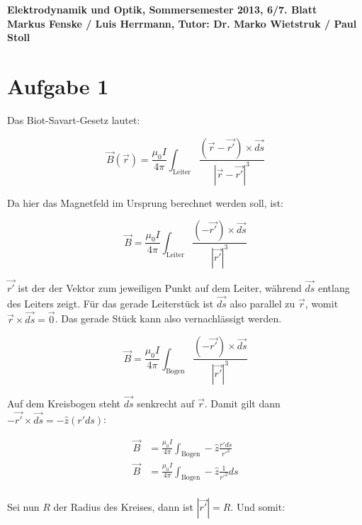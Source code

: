 \documentclass[a4paper,german,12pt,smallheadings]{scrartcl}
\begin{document}
\begin{center}
\bfseries %
\sffamily %
\vspace{-40pt}
Elektrodynamik und Optik, Sommersemester 2013, 6/7. Blatt \\
Markus Fenske / Luis Herrmann, Tutor: Dr. Marko Wietstruk / Paul Stoll
\vspace{-10pt}
\end{center}
\section*{Aufgabe 1}
Das Biot-Savart-Gesetz lautet:

\begin{equation}
  \vec{B}(\vec{r}) = \frac{\mu_0 I}{4 \pi} \int_{\text{Leiter}} \frac{(\vec{r} - \vec{r'}) \times \vec{ds}}{|\vec{r}-\vec{r'}|^3}
\end{equation}

Da hier das Magnetfeld im Ursprung berechnet werden soll, ist:


\begin{equation}
  \vec{B} = \frac{\mu_0 I}{4 \pi} \int_{\text{Leiter}} \frac{(-\vec{r'}) \times \vec{ds}}{|\vec{r'}|^3}
\end{equation}

$\vec{r'}$ ist der der Vektor zum jeweiligen Punkt auf dem Leiter, während
$\vec{ds}$ entlang des Leiters zeigt. Für das gerade Leiterstück ist $\vec{ds}$
also parallel zu $\vec{r}$, womit $\vec{r} \times \vec{ds} = \vec{0}$. Das
gerade Stück kann also vernachlässigt werden.

\begin{equation}
  \vec{B} = \frac{\mu_0 I}{4 \pi} \int_{\text{Bogen}} \frac{(-\vec{r'}) \times \vec{ds}}{|\vec{r'}|^3}
\end{equation}

Auf dem Kreisbogen steht $\vec{ds}$ senkrecht auf $\vec{r}$. Damit gilt dann
$-\vec{r'} \times \vec{ds} = -\widehat{z} (r' ds)$:

\begin{align}
  \vec{B} &= \frac{\mu_0 I}{4 \pi} \int_{\text{Bogen}} -\widehat{z} \frac{r' ds}{r'^3} \\
  \vec{B} &= \frac{\mu_0 I}{4 \pi} \int_{\text{Bogen}} -\widehat{z} \frac{1}{r'^2} ds \\
\end{align}

Sei nun $R$ der Radius des Kreises, dann ist $|\vec{r'}| = R$. Und somit:
\end{document}
